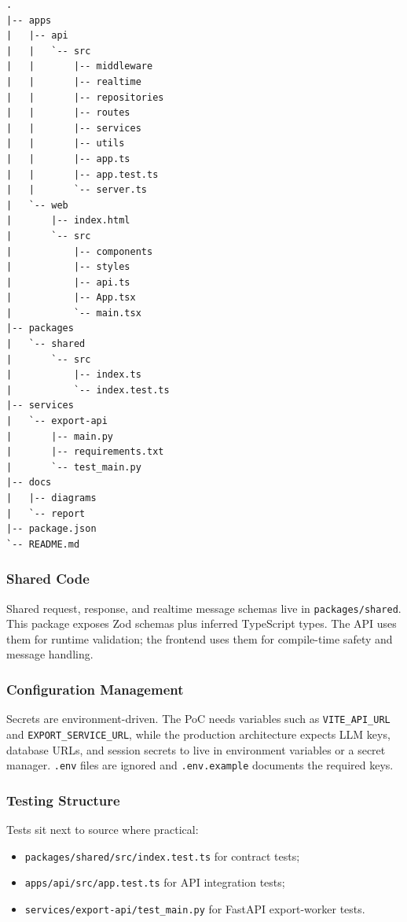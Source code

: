\begin{lstlisting}[style=reportcode,caption={Repository layout},label={lst:repo-tree}]
.
|-- apps
|   |-- api
|   |   `-- src
|   |       |-- middleware
|   |       |-- realtime
|   |       |-- repositories
|   |       |-- routes
|   |       |-- services
|   |       |-- utils
|   |       |-- app.ts
|   |       |-- app.test.ts
|   |       `-- server.ts
|   `-- web
|       |-- index.html
|       `-- src
|           |-- components
|           |-- styles
|           |-- api.ts
|           |-- App.tsx
|           `-- main.tsx
|-- packages
|   `-- shared
|       `-- src
|           |-- index.ts
|           `-- index.test.ts
|-- services
|   `-- export-api
|       |-- main.py
|       |-- requirements.txt
|       `-- test_main.py
|-- docs
|   |-- diagrams
|   `-- report
|-- package.json
`-- README.md
\end{lstlisting}

\subsubsection{Shared Code}

Shared request, response, and realtime message schemas live in \texttt{packages/shared}. This package exposes Zod schemas plus inferred TypeScript types. The API uses them for runtime validation; the frontend uses them for compile-time safety and message handling.

\subsubsection{Configuration Management}

Secrets are environment-driven. The PoC needs variables such as \texttt{VITE\_API\_URL} and \texttt{EXPORT\_SERVICE\_URL}, while the production architecture expects LLM keys, database URLs, and session secrets to live in environment variables or a secret manager. \texttt{.env} files are ignored and \texttt{.env.example} documents the required keys.

\subsubsection{Testing Structure}

Tests sit next to source where practical:

\begin{itemize}[leftmargin=1.3em]
    \item \texttt{packages/shared/src/index.test.ts} for contract tests;
    \item \texttt{apps/api/src/app.test.ts} for API integration tests;
    \item \texttt{services/export-api/test\_main.py} for FastAPI export-worker tests.
\end{itemize}

